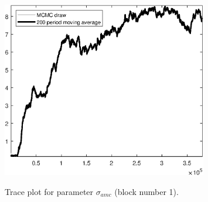 \begin{figure}[H]
\centering
  \includegraphics[width=0.8\textwidth]{BRS_sectoral/graphs/TracePlot_sigma_amc_blck_1}\\
    \caption{Trace plot for parameter ${\sigma_{amc}}$ (block number 1).}
\end{figure}
